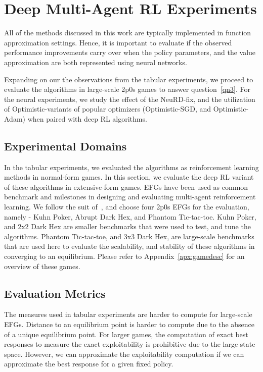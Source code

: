 \chapter{Deep Multi-Agent RL Experiments}

All of the methods discussed in this work are typically implemented in function approximation
settings.
Hence, it is important to evaluate if the observed performance improvements carry over when the
policy parameters, and the value approximation are both represented using neural networks.

Expanding on our the observations from the tabular experiments, we proceed to evaluate the
algorithms in large-scale 2p0s games to answer question~\ref{qn3}.
For the neural experiments, we study the effect of the NeuRD-fix, and the utilization of
Optimistic-variants of popular optimizers (Optimistic-SGD, and Optimistic-Adam) when paired with
deep RL algorithms.

\section{Experimental Domains}
In the tabular experiments, we evaluated the algorithms as reinforcement learning methods in
normal-form games.
In this section, we evaluate the deep RL variant of these algorithms in extensive-form games.
EFGs have been used as common benchmark and milestones in designing and evaluating multi-agent
reinforcement learning.
We follow the suit of~\cite{sokotaUnified2023}, and choose four 2p0s EFGs for the evaluation,
namely - Kuhn Poker, Abrupt Dark Hex, and Phantom Tic-tac-toe.
Kuhn Poker, and 2x2 Dark Hex are smaller benchmarks that were used to test, and tune the
algorithms.
Phantom Tic-tac-toe, and 3x3 Dark Hex, are large-scale benchmarks that are used here to evaluate
the scalability, and stability of these algorithms in converging to an equilibrium.
Please refer to Appendix~\ref{apx:gamedesc} for an overview of these games.

\section{Evaluation Metrics}
The measures used in tabular experiments are harder to compute for large-scale EFGs.
Distance to an equilibrium point is harder to compute due to the absence of a unique equilibrium
point.
For larger games, the computation of exact best responses to measure the exact exploitability is
prohibitive due to the large state space.
However, we can approximate the exploitability computation if we can approximate the best response
for a given fixed policy.

